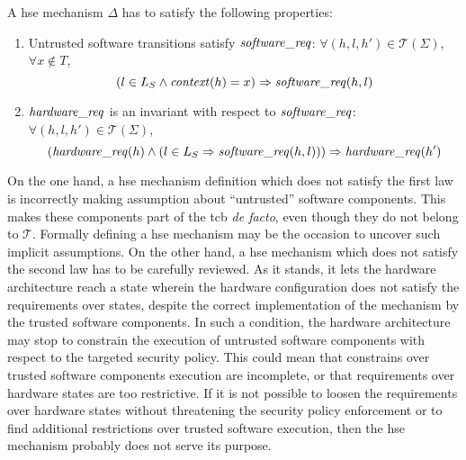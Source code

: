 \begin{definition}
  \label{def:speccert:laws}
  A \ac{hse} mechanism $\Delta$ has to satisfy the following properties:
  \begin{enumerate}
  \item Untrusted software transitions satisfy $\mathit{software\_req}$:
    $\forall (h, l, h') \in \mathcal{T}(\Sigma)$, $\forall x \not\in T$,
    \[
      (l \in L_S \wedge \mathit{context}(h) = x) \Rightarrow \mathit{software\_req}(h,
      l)
    \]
  \item $\mathit{hardware\_req}$ is an invariant with respect to
    $\mathit{software\_req}$: $\forall (h, l, h') \in \mathcal{T}(\Sigma)$,
    \[
      (\mathit{hardware\_req}(h) \wedge (l \in L_S \Rightarrow
      \mathit{software\_req}(h,l))) \Rightarrow \mathit{hardware\_req}(h')
    \]
  \end{enumerate}
\end{definition}

On the one hand, a \ac{hse} mechanism definition which does not satisfy the
first law is incorrectly making assumption about ``untrusted'' software
components.
%
This makes these components part of the \ac{tcb} \emph{de facto}, even though
they do not belong to $\mathcal{T}$.
%
Formally defining a \ac{hse} mechanism may be the occasion to uncover such
implicit assumptions.
%
On the other hand, a \ac{hse} mechanism which does not satisfy the second law
has to be carefully reviewed.
%
As it stands, it lets the hardware architecture reach a state wherein the
hardware configuration does not satisfy the requirements over states, despite
the correct implementation of the mechanism by the trusted software components.
%
In such a condition, the hardware architecture may stop to constrain the
execution of untrusted software components with respect to the targeted security
policy.
%
This could mean that constrains over trusted software components execution are
incomplete, or that requirements over hardware states are too restrictive.
%
If it is not possible to loosen the requirements over hardware states without
threatening the security policy enforcement or to find additional restrictions
over trusted software execution, then the \ac{hse} mechanism probably does not
serve its purpose.

